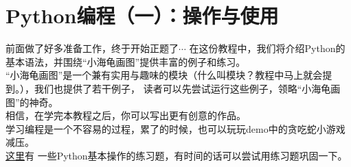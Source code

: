 \part{Python编程（一）：操作与使用}
前面做了好多准备工作，终于开始正题了$\cdots$
在这份教程中，我们将介绍Python的基本语法，并围绕“小海龟画图”提供丰富的例子和练习。\\
“小海龟画图”是一个兼有实用与趣味的模块（什么叫模块？教程中马上就会提到。），我们也提供了若干例子，
读者可以先尝试运行这些例子，领略“小海龟画图”的神奇。\\
相信，在学完本教程之后，你可以写出更有创意的作品。\\
学习编程是一个不容易的过程，累了的时候，也可以玩玩demo中的贪吃蛇小游戏减压。\\
\href{http://www.runoob.com/python/python-100-examples.html}{这里}有
一些Python基本操作的练习题，有时间的话可以尝试用练习题巩固一下。

